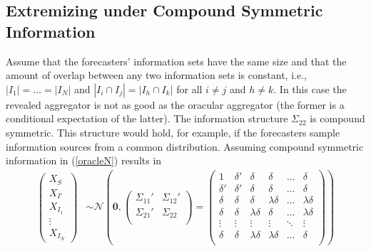 \documentclass[11pt]{article}
\theoremstyle{definition}
\theoremstyle{definition}
\def\probit{p_{\rm probit}}
\begin{document}
\subsection{Extremizing under Compound Symmetric Information}
\label{compound}

Assume that the forecasters' information sets have the 
same size and that the amount of overlap between any two information 
sets is constant, i.e., $|I_{1}| =  \dots = |I_{N}|$ and 
$|I_{i} \cap I_{j}| = |I_{h} \cap I_{k}|$ for all $i \neq j$ 
and $h \neq k$.  In this case the revealed aggregator is not
as good as the oracular aggregator (the former is a conditional
expectation of the latter).  
The information structure $\Sigma_{22}$ is compound symmetric.  
This structure would hold, for example, if the forecasters 
sample information sources from a common distribution. 
Assuming compound symmetric information in (\ref{oracleN}) results in
\begin{align}
\label{eq:symmetric}
\left(\begin{matrix} X_{S} \\ X_{I'}\\ X_{I_1}\\ \vdots \\ X_{I_N} 
   \end{matrix}\right) 
  &\sim \mathcal{N}\left( \boldsymbol{0}, \left(\begin{matrix} 
\Sigma_{11}' & \Sigma_{12}'\\
\Sigma_{21}' & \Sigma_{22}\\
 \end{matrix}\right) 
 =
 \left(\begin{array}{cc|cccc}
1 & \delta'& \delta & \delta & \dots & \delta  \\ 
\delta' & \delta' & \delta & \delta & \dots & \delta  \\ \hline
\delta & \delta &\delta & \lambda\delta & \dots & \lambda\delta   \\ 
\delta& \delta & \lambda\delta & \delta & \dots & \lambda\delta  \\ 
\vdots &\vdots & \vdots & \vdots & \ddots & \vdots  \\ 
\delta &\delta & \lambda\delta & \lambda\delta & \dots & \delta\\ 
 \end{array}\right)\right)
\end{align}
\end{document}
